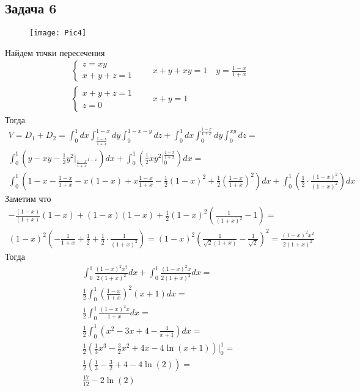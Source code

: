 \newpage
\subsection*{Задача 6}
	\begin{figure}[!h]
		\texttt{[image: Pic4]}
	\end{figure}
	\vskip 0.2in
	Найдем точки пересечения
	\begin{gather*}
	\begin{cases}
	z = xy\\
	x+y+z = 1
	\end{cases}
	\qquad
	x+y+xy = 1\quad y = \frac{1-x}{1+x}\\
	\begin{cases}
	x+y+z = 1\\
	z = 0
	\end{cases}
	\qquad
	x+y = 1
	\end{gather*}
	Тогда
	\begin{gather*}
	V = D_1 + D_2 = \int_{0}^{1} dx \int_{\frac{1-x}{1+x}}^{1-x} dy \int_{0}^{1-x-y} dz + \int_{0}^{1} dx \int_{0}^{\frac{1-x}{1+x}} dy \int_{0}^{xy} dz =\\
	\int_{0}^{1} \left(y - xy - \frac{1}{2}y^2 \bigg|_{\frac{1-x}{1+x}^{1-x}}\right)dx + \int_{0}^{1} \left(\frac{1}{2}xy^2\bigg|_{0}^{\frac{1-x}{1+x}}\right) dx =\\
	\int_{0}^{1} \left(1 - x - \frac{1-x}{1+x} - x(1-x) + x \frac{1-x}{1+x} - \frac{1}{2}(1-x)^2 + \frac{1}{2} \left(\frac{1-x}{1+x}\right)^2\right)dx + \int_{0}^{1} \left(\frac{1}{2} \cdot \frac{(1-x)^2}{(1+x)^2}\right) dx
	\end{gather*}
	Заметим что
	\begin{gather*}
	-\frac{(1-x)}{(1+x)}(1-x) + (1-x)(1-x) + \frac{1}{2}(1-x)^2 \left(\frac{1}{(1+x)^2} - 1\right) =\\
	(1-x)^2 \left(-\frac{1}{1+x} + \frac{1}{2} + \frac{1}{2} \cdot \frac{1}{(1+x)^2}\right) =
	(1-x)^2 \left(\frac{1}{\sqrt{2}(1+x)} - \frac{1}{\sqrt{2}}\right)^2 =
	\frac{(1-x)^2 x^2}{2(1+x)^2}
	\end{gather*}
	Тогда
	\begin{gather*}
	\int_{0}^{1} \frac{(1-x)^2 x^2}{2(1+x)^2} dx + \int_{0}^{1} \frac{(1-x)^2 x}{2(1+x)^2} dx =\\
	\frac{1}{2} \int_{0}^{1} \left(\frac{1-x}{1+x}\right)^2 (x+1) dx =\\
	\frac{1}{2} \int_{0}^{1} \frac{(1-x)^2 x}{1+x} dx =\\
	\frac{1}{2} \int_{0}^{1} (x^2 - 3x + 4 - \frac{4}{x+1}) dx =\\
	\frac{1}{2} \left(\frac{1}{3}x^3 - \frac{3}{2}x^2 + 4x - 4\ln(x+1)\right)\bigg|_{0}^{1} =\\
	\frac{1}{2} \left(\frac{1}{3} - \frac{3}{2} + 4 - 4\ln(2)\right) =\\
	\frac{17}{12} - 2\ln(2)
	\end{gather*}
